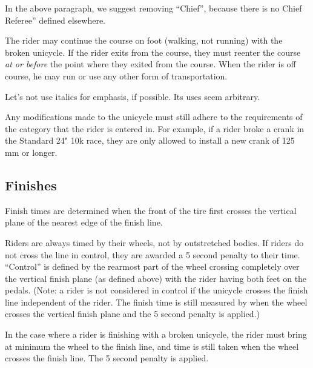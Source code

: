 \begin{framed}
In the above paragraph, we suggest removing ``Chief'', because there is no Chief Referee'' defined elsewhere.
\end{framed}

The rider may continue the course on foot (walking, not running) with the broken unicycle.
If the rider exits from the course, they must reenter the course \emph{at or before} the point where they exited from the course.
When the rider is off course, he may run or use any other form of transportation.

\begin{framed}
Let's not use italics for emphasis, if possible.  Its uses seem arbitrary.
\end{framed}

Any modifications made to the unicycle must still adhere to the requirements of the category that the rider is entered in.
For example, if a rider broke a crank in the Standard 24" 10k race, they are only allowed to install a new crank of 125 mm or longer.


\subsection{Finishes}

Finish times are determined when the front of the tire first crosses the vertical plane of the nearest edge of the finish line. 

Riders are always timed by their wheels, not by outstretched bodies.
If riders do not cross the line in control, they are awarded a 5 second penalty to their time.
``Control'' is defined by the rearmost part of the wheel crossing completely over the vertical finish plane (as defined above) with the rider having both feet on the pedals.
(Note: a rider is not considered in control if the unicycle crosses the finish line independent of the rider.
The finish time is still measured by when the wheel crosses the vertical finish plane and the 5 second penalty is applied.)

In the case where a rider is finishing with a broken unicycle, the rider must bring at minimum the wheel to the finish line, and time is still taken when the wheel crosses the finish line.
The 5 second penalty is applied.

